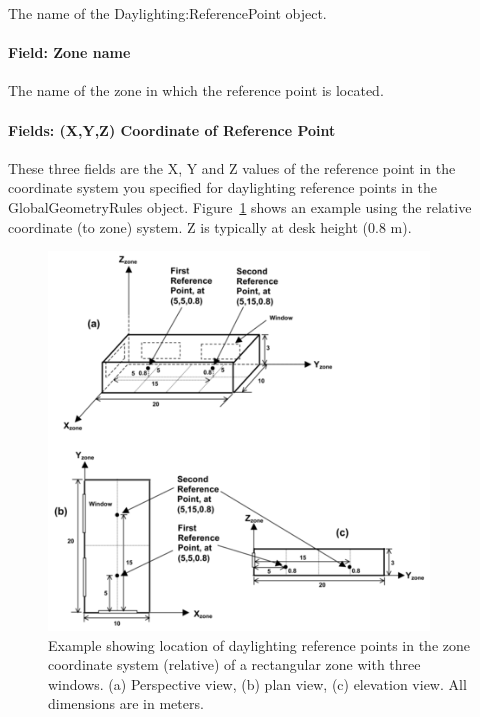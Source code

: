 The name of the Daylighting:ReferencePoint object.

\paragraph{Field: Zone name}\label{field-zone-name-003}

The name of the zone in which the reference point is located.

\paragraph{Fields: (X,Y,Z) Coordinate of Reference Point}\label{fields-xyz-of-reference-point}

These three fields are the X, Y and Z values of the reference point in the coordinate system you specified for daylighting reference points in the GlobalGeometryRules object. Figure~\ref{fig:example-showing-location-of-daylighting} shows an example using the relative coordinate (to zone) system. Z is typically at desk height (0.8 m).

\begin{figure}[hbtp] %
\centering
\includegraphics[width=0.9\textwidth, height=0.9\textheight, keepaspectratio=true]{media/image095.png}
\caption{Example showing location of daylighting reference points in the zone coordinate system (relative) of a rectangular zone with three windows. (a) Perspective view, (b) plan view, (c) elevation view. All dimensions are in meters. \protect \label{fig:example-showing-location-of-daylighting}}
\end{figure}




